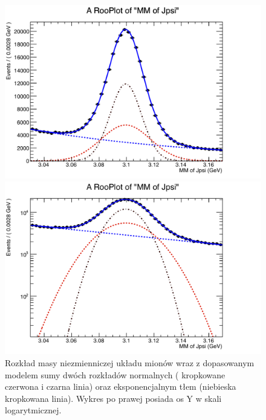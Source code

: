 \begin{figure}[H]    
\begin{minipage}[t]{0.6\textwidth}
\includegraphics[width=\linewidth]{rozdzial6/jpsi_mm_sPlot_RDfit.png}
\end{minipage}
\hspace{\fill}
\begin{minipage}[t]{0.5\textwidth}
\includegraphics[width=\linewidth]{rozdzial6/jpsi_mm_sPlot_RDfit_logy.png}
\end{minipage}
\caption{Rozkład masy niezmienniczej układu mionów wraz z dopasowanym modelem sumy dwóch rozkładów normalnych ( kropkowane czerwona i czarna linia) oraz eksponencjalnym tłem (niebieska kropkowana linia). Wykres po prawej posiada os Y w skali logarytmicznej.} \label{massJPsi}
\end{figure} 


